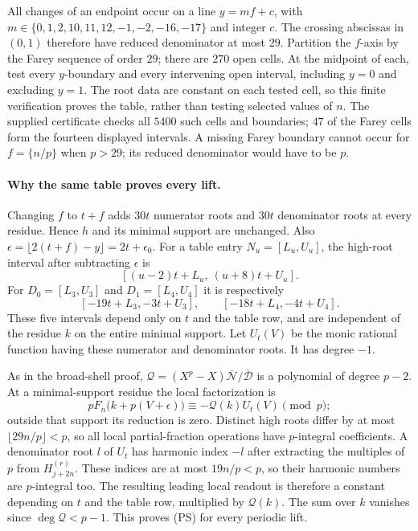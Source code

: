 \documentclass[11pt]{article}
\begin{document}
All changes of an endpoint occur on a line
$y=mf+c$, with $m\in\{0,1,2,10,11,12,-1,-2,-16,-17\}$ and integer $c$.
The crossing abscissas in $(0,1)$ therefore have reduced denominator at
most $29$.  Partition the $f$-axis by the Farey sequence of order $29$;
there are $270$ open cells.  At the midpoint of each, test every
$y$-boundary and every intervening open interval, including $y=0$ and
excluding $y=1$.  The root data are constant on each tested cell, so this
finite verification proves the table, rather than testing selected
values of $n$.  The supplied certificate checks all $5400$ such cells
and boundaries; $47$ of the Farey cells form the fourteen displayed
intervals.  A missing Farey boundary cannot occur for $f=\{n/p\}$ when
$p>29$; its reduced denominator would have to be $p$.

\paragraph{Why the same table proves every lift.}
Changing $f$ to $t+f$ adds $30t$ numerator roots and $30t$ denominator
roots at every residue.  Hence $h$ and its minimal support are unchanged.
Also $\epsilon=\lfloor2(t+f)-y\rfloor=2t+\epsilon_0$.
For a table entry $N_u=[L_u,U_u]$, the high-root interval after subtracting
$\epsilon$ is
\[
 [(u-2)t+L_u,\ (u+8)t+U_u].
\]
For $D_0=[L_3,U_3]$ and $D_1=[L_4,U_4]$ it is respectively
\[
 [-19t+L_3,-3t+U_3],\qquad[-18t+L_4,-4t+U_4].
\]
These five intervals depend only on $t$ and the table row, and are
independent of the residue $k$ on the entire minimal support.  Let
$U_t(V)$ be the monic rational function having these numerator and
denominator roots.  It has degree $-1$.

As in the broad-shell proof,
$\mathcal Q=(X^p-X)\overline{\mathcal N}/\overline{\mathcal D}$ is a
polynomial of degree $p-2$.  At a minimal-support residue the local
factorization is
\[
 pF_n\bigl(k+p(V+\epsilon)\bigr)
       \equiv-\mathcal Q(k)U_t(V)\pmod p;
\]
outside that support its reduction is zero.  Distinct high roots differ
by at most $\lfloor29n/p\rfloor<p$, so all local partial-fraction
operations have $p$-integral coefficients.  A denominator root $l$ of
$U_t$ has harmonic index $-l$ after extracting the multiples of $p$ from
$H_{j+2n}^{(r)}$.  These indices are at most $19n/p<p$, so their harmonic
numbers are $p$-integral too.  The resulting leading local readout is
therefore a constant depending on $t$ and the table row, multiplied by
$\mathcal Q(k)$.  The sum over $k$ vanishes since
$\deg\mathcal Q<p-1$.  This proves (PS) for every periodic lift.
\end{document}
